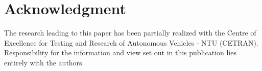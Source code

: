 \section*{Acknowledgment}

The research leading to this paper has been partially realized with the Centre of Excellence for Testing and Research of Autonomous Vehicles - NTU (CETRAN). Responsibility for the information and view set out in this publication lies entirely with the authors. 
